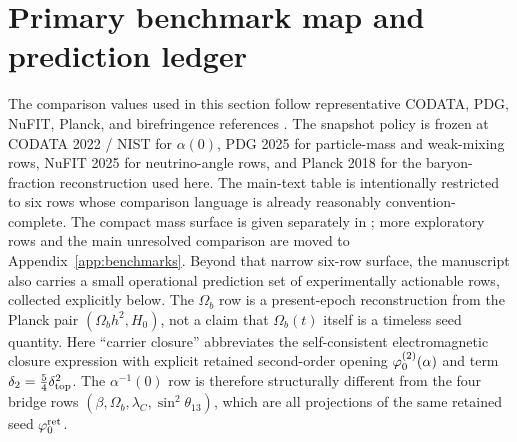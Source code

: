 \section{Primary benchmark map and prediction ledger}

The comparison values used in this section follow representative CODATA, PDG, NuFIT, Planck, and birefringence references \cite{codata2022,pdg2025,nufit2025,planck2018,minamiKomatsu2020,eskilt2023,sullivan2025}. The snapshot policy is frozen at CODATA 2022 / NIST for $\alpha(0)$, PDG 2025 for particle-mass and weak-mixing rows, NuFIT 2025 for neutrino-angle rows, and Planck 2018 for the baryon-fraction reconstruction used here. The main-text table is intentionally restricted to six rows whose comparison language is already reasonably convention-complete. The compact mass surface is given separately in ; more exploratory rows and the main unresolved comparison are moved to Appendix~\ref{app:benchmarks}. Beyond that narrow six-row surface, the manuscript also carries a small operational prediction set of experimentally actionable rows, collected explicitly below. The $\Omega_b$ row is a present-epoch reconstruction from the Planck pair $(\Omega_b h^2,H_0)$, not a claim that $\Omega_b(t)$ itself is a timeless seed quantity.
Here \enquote{carrier closure} abbreviates the self-consistent electromagnetic closure expression with explicit retained second-order opening $\varphi_0^{(2)}(\alpha)$ and term $\delta_2=\frac54\delta_{\mathrm{top}}^2$. The $\alpha^{-1}(0)$ row is therefore structurally different from the four bridge rows $(\beta,\Omega_b,\lambda_C,\sin^2\theta_{13})$, which are all projections of the same retained seed $\varphi_0^{\mathrm{ret}}$.

